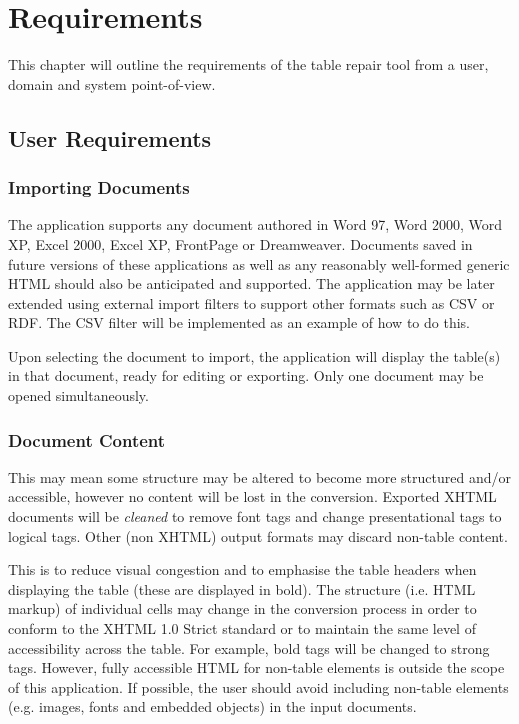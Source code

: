 \section{Requirements}

This chapter will outline the requirements of the table repair tool from
a user, domain and system point-of-view.

\subsection{User Requirements}

\label{userreqs}

\subsubsection{Importing Documents}

 The application supports any document authored in Word 97, Word 2000,
Word XP, Excel 2000, Excel XP, FrontPage or Dreamweaver. Documents saved in
future versions of these applications as well as any reasonably well-formed
generic HTML should also be anticipated and supported. The application may be
later extended using external import filters to support other formats such as
CSV or RDF. The CSV filter will be implemented as an example of how to do this.

Upon selecting the document to import, the application will display the
table(s) in that document, ready for editing or exporting. Only one document
may be opened simultaneously.

\subsubsection{Document Content}

 This may mean some structure may
be altered to become more structured and/or accessible, however no content will
be lost in the conversion. Exported XHTML documents will be \emph{cleaned} to
remove font tags and change presentational tags to logical tags. Other (non
XHTML) output formats may discard non-table content.

 This is to reduce visual congestion and to emphasise the
table headers when displaying the table (these are displayed in bold). The
structure (i.e. HTML markup) of individual cells may change in the conversion
process in order to conform to the XHTML 1.0 Strict standard or to maintain the
same level of accessibility across the table. For example, bold tags will be
changed to strong tags. However, fully accessible HTML for non-table elements
is outside the scope of this application. If possible, the user should avoid
including non-table elements (e.g. images, fonts and embedded objects) in the
input documents.

